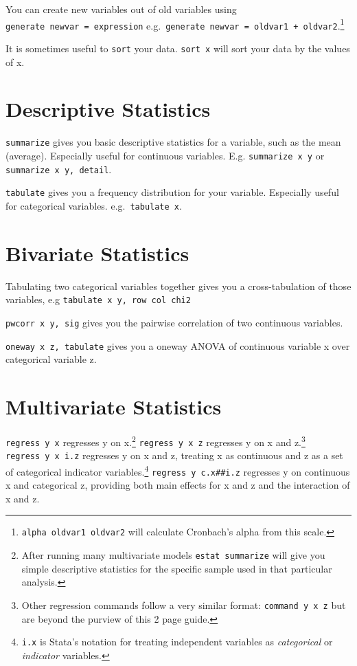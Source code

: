 \documentclass[
]{report}
\begin{document}
You can create new variables out of old variables using
\texttt{generate\ newvar\ =\ expression}
e.g.~\texttt{generate\ newvar\ =\ oldvar1\ +\ oldvar2}.\footnote{\texttt{alpha\ oldvar1\ oldvar2}
  will calculate Cronbach's alpha from this scale.}

It is sometimes useful to \texttt{sort} your data. \texttt{sort\ x} will
sort your data by the values of x.

\hypertarget{descriptive-statistics}{%
\section{Descriptive Statistics}\label{descriptive-statistics}}

\texttt{summarize} gives you basic descriptive statistics for a
variable, such as the mean (average). Especially useful for continuous
variables. E.g. \texttt{summarize\ x\ y} or
\texttt{summarize\ x\ y,\ detail}.

\texttt{tabulate} gives you a frequency distribution for your variable.
Especially useful for categorical variables. e.g.~\texttt{tabulate\ x}.

\hypertarget{bivariate-statistics}{%
\section{Bivariate Statistics}\label{bivariate-statistics}}

Tabulating two categorical variables together gives you a
cross-tabulation of those variables, e.g
\texttt{tabulate\ x\ y,\ row\ col\ chi2}

\texttt{pwcorr\ x\ y,\ sig} gives you the pairwise correlation of two
continuous variables.

\texttt{oneway\ x\ z,\ tabulate} gives you a oneway ANOVA of continuous
variable x over categorical variable z.

\hypertarget{multivariate-statistics}{%
\section{Multivariate Statistics}\label{multivariate-statistics}}

\texttt{regress\ y\ x} regresses y on x.\footnote{After running many
  multivariate models \texttt{estat\ summarize} will give you simple
  descriptive statistics for the specific sample used in that particular
  analysis.} \texttt{regress\ y\ x\ z} regresses y on x and
z.\footnote{Other regression commands follow a very similar format:
  \texttt{command\ y\ x\ z} but are beyond the purview of this 2 page
  guide.} \texttt{regress\ y\ x\ i.z} regresses y on x and z, treating x
as continuous and z as a set of categorical indicator
variables.\footnote{\texttt{i.x} is Stata's notation for treating
  independent variables as \emph{categorical} or \emph{indicator}
  variables.} \texttt{regress\ y\ c.x\#\#i.z} regresses y on continuous
x and categorical z, providing both main effects for x and z and the
interaction of x and z.
\end{document}
